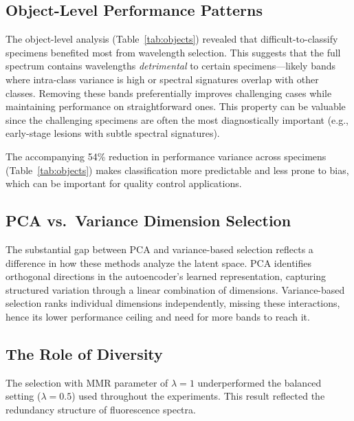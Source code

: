 \subsection{Object-Level Performance Patterns}
\label{sec:discussion_objects}
The object-level analysis (Table~\ref{tab:objects}) revealed that difficult-to-classify specimens benefited most from wavelength selection.
This suggests that the full spectrum contains wavelengths \emph{detrimental} to certain specimens---likely bands where intra-class variance is high or spectral signatures overlap with other classes.
Removing these bands preferentially improves challenging cases while maintaining performance on straightforward ones.
This property can be valuable since the challenging specimens are often the most diagnostically important (e.g., early-stage lesions with subtle spectral signatures).

The accompanying 54\% reduction in performance variance across specimens (Table~\ref{tab:objects}) makes classification more predictable and less prone to bias, which can be important for quality control applications.

\subsection{PCA vs.\ Variance Dimension Selection}
\label{sec:discussion_pca}

The substantial gap between PCA and variance-based selection reflects a difference in how these methods analyze the latent space.
PCA identifies orthogonal directions in the autoencoder's learned representation, capturing structured variation through a linear combination of dimensions.
Variance-based selection ranks individual dimensions independently, missing these interactions, hence its lower performance ceiling and need for more bands to reach it.

\subsection{The Role of Diversity}
\label{sec:discussion_diversity}

The selection with MMR parameter of $\lambda = 1$ underperformed the balanced setting ($\lambda = 0.5$) used throughout the experiments.
This result reflected the redundancy structure of fluorescence spectra.

